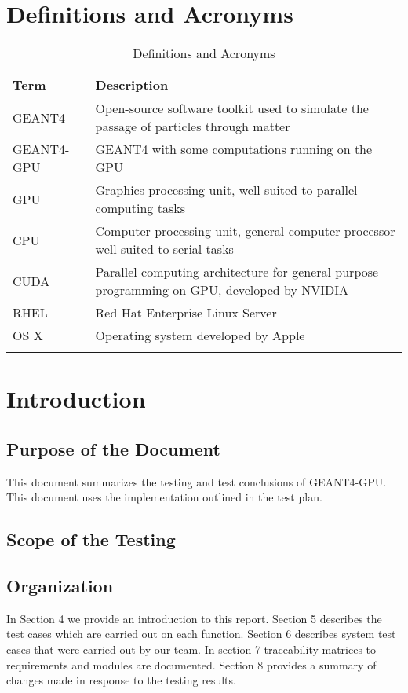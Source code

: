 \documentclass[12pt]{article}
\begin{document}
\section*{Definitions and Acronyms} %
\begin{table}[h]
\centering
\caption{Definitions and Acronyms}\label{Table_DefAndAcro}
\begin{tabularx}{\textwidth}{l|X}
\Xhline{2\arrayrulewidth}
\bf Term & \bf Description\\
\hline
GEANT4 & Open-source software toolkit used to simulate the passage of particles through matter\\\hline
GEANT4-GPU & GEANT4 with some computations running on the GPU\\\hline
GPU & Graphics processing unit, well-suited to parallel computing tasks\\\hline
CPU & Computer processing unit, general computer processor well-suited to serial tasks\\\hline
CUDA & Parallel computing architecture for general purpose programming on GPU, developed by NVIDIA\\\hline
RHEL & Red Hat Enterprise Linux Server\\\hline
OS X & Operating system developed by Apple\\
\Xhline{2\arrayrulewidth}
\end{tabularx}
\end{table}


\section{Introduction}
\subsection{Purpose of the Document}
This document summarizes the testing and test conclusions of GEANT4-GPU. This document uses the implementation outlined in the test plan.
\subsection{Scope of the Testing}
\subsection{Organization}
In Section 4 we provide an introduction to this report. Section 5 describes the test cases which are carried out on each function. Section 6 describes system test cases that were carried out by our team. In section 7 traceability matrices to requirements and modules are documented. Section 8 provides a summary of changes made in response to the testing results.
\end{document}
